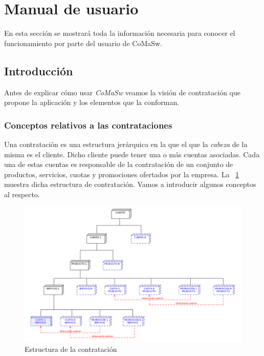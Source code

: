\section{Manual de usuario}
\label{sec:manual-usuario}

En esta sección se mostrará toda la información necesaria para conocer el funcionamiento por parte del usuario de CoMaSw.


\subsection{Introducción}
\label{sub:introduccion}

Antes de explicar cómo usar \emph{CoMaSw} veamos la visión de contratación que propone la aplicación y los elementos que la conforman.



\subsubsection{Conceptos relativos a las contrataciones}
\label{sub:contratacion-conceptos}

Una contratación es una estructura jerárquica en la que el que la \textit{cabeza} de la misma es el cliente. Dicho cliente puede tener una o más cuentas asociadas. Cada una de estas cuentas es responsable de la contratación de un conjunto de productos, servicios, cuotas y promociones ofertados por la empresa. La \figurename~\ref{fig:estructura-contratacion} muestra dicha estructura de contratación. Vamos a introducir algunos conceptos al respecto.

\begin{figure}
  \centering
  \includegraphics[width=\textwidth]{imaxes/estructura-contratacion.png}
  \caption{Estructura de la contratación}
  \label{fig:estructura-contratacion}
\end{figure}

